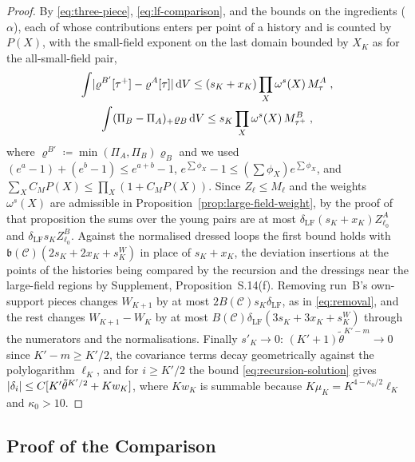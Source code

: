 \documentclass[11pt]{preprint}
\newcommand{\dd}{\mathrm{d}}
\DeclarePairedDelimiter{\abs}{\lvert}{\rvert}
\numberwithin{equation}{section}
\theoremstyle{definition}
\theoremstyle{remark}
\theoremstyle{plain}
\begin{document}
\begin{proof}
By \eqref{eq:three-piece}, \eqref{eq:lf-comparison}, and the bounds on the ingredients ($\alpha$), each of whose contributions enters per point of a history and is counted by $P(X)$, with the small-field exponent on the last domain bounded by $X_K$ as for the all-small-field pair,
\begin{equation}\label{eq:young-pair-bound}
\begin{gathered}
    \int\abs{\varrho^{B'}[\tau^+] - \varrho^A[\tau]}\,\dd V \leq (s_K + x_K)\prod_{X}\omega^s(X)\,M^A_\tau\;,\\
    \int(\Pi_B - \Pi_A)_+\varrho_B\,\dd V \leq s_K\prod_X\omega^s(X)\,M^B_{\tau^+}\;,
\end{gathered}
\end{equation}
where $\varrho^{B'} \coloneqq \min(\Pi_A, \Pi_B)\varrho_B$ and we used $(e^a - 1) + (e^b - 1) \leq e^{a+b} - 1$, $e^{\sum\phi_X} - 1 \leq (\sum\phi_X)e^{\sum\phi_X}$, and $\sum_XC_MP(X) \leq \prod_X(1 + C_MP(X))$. Since $Z_\ell \leq M_\ell$ and the weights $\omega^s(X)$ are admissible in Proposition~\ref{prop:large-field-weight}, by the proof of that proposition the sums over the young pairs are at most $\delta_{\mathrm{LF}}(s_K + x_K)Z^A_{\ell_0}$ and $\delta_{\mathrm{LF}}s_KZ^B_{\ell_0}$. Against the normalised dressed loops the first bound holds with $\mathfrak b(\mathcal C)(2s_K + 2x_K + s^W_K)$ in place of $s_K + x_K$, the deviation insertions at the points of the histories being compared by the recursion and the dressings near the large-field regions by Supplement, Proposition~S.14(f). Removing run~B's own-support pieces changes $W_{K+1}$ by at most $2B(\mathcal C)s_K\delta_{\mathrm{LF}}$, as in \eqref{eq:removal}, and the rest changes $W_{K+1} - W_K$ by at most $B(\mathcal C)\delta_{\mathrm{LF}}(3s_K + 3x_K + s^W_K)$ through the numerators and the normalisations. Finally $s'_K \to 0$: $(K' + 1)\tilde\theta^{K'-m} \to 0$ since $K' - m \geq K'/2$, the covariance terms decay geometrically against the polylogarithm $\ell_K$, and for $i \geq K'/2$ the bound \eqref{eq:recursion-solution} gives $\abs{\delta_i} \leq C[K'\tilde\theta^{K'/2} + Kw_K]$, where $Kw_K$ is summable because $K\mu_K = K^{4-\kappa_0/2}\ell_K$ and $\kappa_0 > 10$.
\end{proof}

\subsection{Proof of the Comparison}\label{sec:cauchy-proof}
\end{document}
